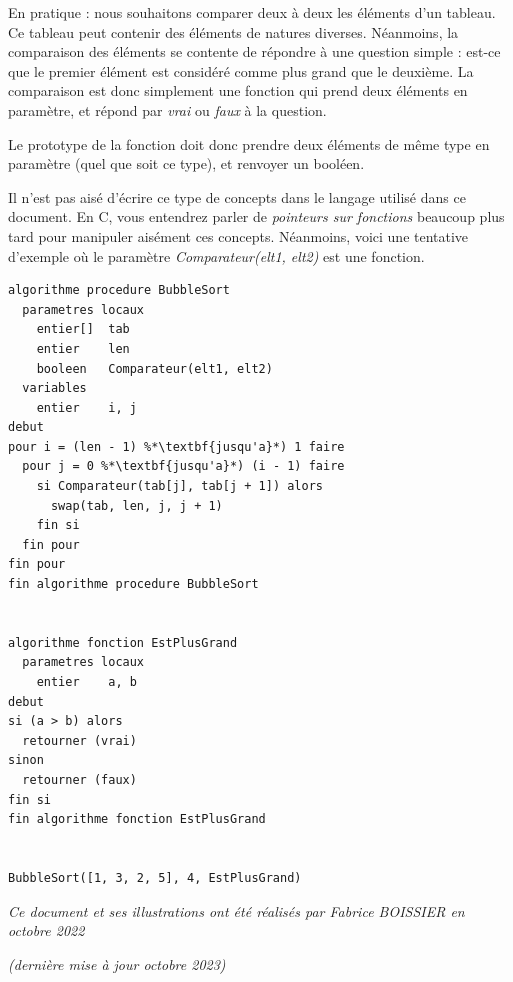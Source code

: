 \documentclass[11pt,a4paper]{article}
\begin{document}
\bigskip

En pratique : nous souhaitons comparer deux à deux les éléments d'un tableau.
Ce tableau peut contenir des éléments de natures diverses.
Néanmoins, la comparaison des éléments se contente de répondre à une question simple : est-ce que le premier élément est considéré comme plus grand que le deuxième.
La comparaison est donc simplement une fonction qui prend deux éléments en paramètre, et répond par \textit{vrai} ou \textit{faux} à la question.

Le prototype de la fonction doit donc prendre deux éléments de même type en paramètre (quel que soit ce type), et renvoyer un booléen.

\bigskip

Il n'est pas aisé d'écrire ce type de concepts dans le langage utilisé dans ce document.
En C, vous entendrez parler de \textit{pointeurs sur fonctions} beaucoup plus tard pour manipuler aisément ces concepts.
Néanmoins, voici une tentative d'exemple où le paramètre \textit{Comparateur(elt1, elt2)} est une fonction.

\clearpage

\begin{center}
\begin{lstlisting}[style=algorithmique]
algorithme procedure BubbleSort
  parametres locaux
    entier[]  tab
    entier    len
    booleen   Comparateur(elt1, elt2)
  variables
    entier    i, j
debut
pour i = (len - 1) %*\textbf{jusqu'a}*) 1 faire
  pour j = 0 %*\textbf{jusqu'a}*) (i - 1) faire
    si Comparateur(tab[j], tab[j + 1]) alors
      swap(tab, len, j, j + 1)
    fin si
  fin pour
fin pour
fin algorithme procedure BubbleSort


algorithme fonction EstPlusGrand
  parametres locaux
    entier    a, b
debut
si (a > b) alors
  retourner (vrai)
sinon
  retourner (faux)
fin si
fin algorithme fonction EstPlusGrand


BubbleSort([1, 3, 2, 5], 4, EstPlusGrand) \end{lstlisting}
\end{center}



\bigskip

\vfillFirst

\vfillLast

\begin{center}
\textit{Ce document et ses illustrations ont été réalisés par Fabrice BOISSIER en octobre 2022}

\textit{(dernière mise à jour octobre 2023)}
\end{center}
\end{document}
